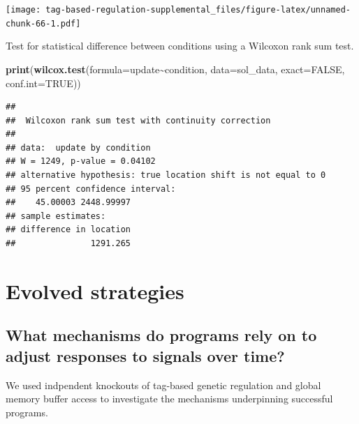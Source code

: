 \documentclass[
]{book}
\newenvironment{Shaded}{\begin{snugshade}}{\end{snugshade}}
\newcommand{\DataTypeTok}[1]{\textcolor[rgb]{0.13,0.29,0.53}{#1}}
\newcommand{\KeywordTok}[1]{\textcolor[rgb]{0.13,0.29,0.53}{\textbf{#1}}}
\newcommand{\NormalTok}[1]{#1}
\newcommand{\OperatorTok}[1]{\textcolor[rgb]{0.81,0.36,0.00}{\textbf{#1}}}
\newcommand{\OtherTok}[1]{\textcolor[rgb]{0.56,0.35,0.01}{#1}}
\begin{document}
\texttt{[image: tag-based-regulation-supplemental\_files/figure-latex/unnamed-chunk-66-1.pdf]}

Test for statistical difference between conditions using a Wilcoxon rank sum test.

\begin{Shaded}
\begin{Highlighting}[]
\KeywordTok{print}\NormalTok{(}\KeywordTok{wilcox.test}\NormalTok{(}\DataTypeTok{formula=}\NormalTok{update}\OperatorTok{\textasciitilde{}}\NormalTok{condition, }\DataTypeTok{data=}\NormalTok{sol\_data, }\DataTypeTok{exact=}\OtherTok{FALSE}\NormalTok{, }\DataTypeTok{conf.int=}\OtherTok{TRUE}\NormalTok{))}
\end{Highlighting}
\end{Shaded}

\begin{verbatim}
## 
##  Wilcoxon rank sum test with continuity correction
## 
## data:  update by condition
## W = 1249, p-value = 0.04102
## alternative hypothesis: true location shift is not equal to 0
## 95 percent confidence interval:
##    45.00003 2448.99997
## sample estimates:
## difference in location 
##               1291.265
\end{verbatim}

\hypertarget{evolved-strategies-1}{%
\section{Evolved strategies}\label{evolved-strategies-1}}

\hypertarget{what-mechanisms-do-programs-rely-on-to-adjust-responses-to-signals-over-time-1}{%
\subsection{What mechanisms do programs rely on to adjust responses to signals over time?}\label{what-mechanisms-do-programs-rely-on-to-adjust-responses-to-signals-over-time-1}}

We used indpendent knockouts of tag-based genetic regulation and global memory buffer access to investigate the mechanisms underpinning successful programs.
\end{document}
